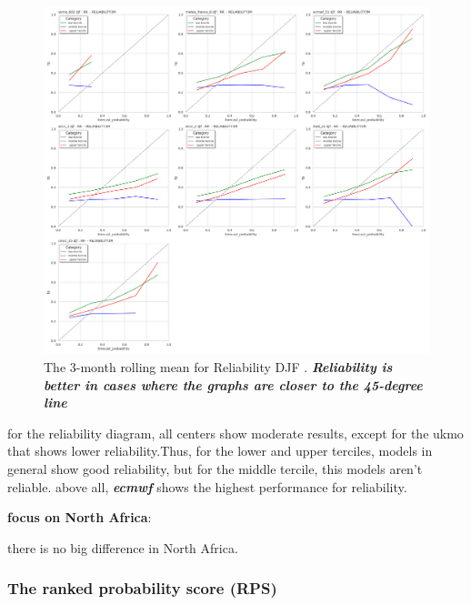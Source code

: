 \begin{figure}[H]
\centering
\includegraphics[scale=0.3]{plots/prob/rela/rela_diagram_RR_djf.png}
\caption{The 3-month rolling mean for Reliability DJF   . \textbf{\textit{Reliability is better in cases where the graphs are closer to the 45-degree line}}}
\end{figure}

for the reliability diagram, all centers show moderate results, except for the ukmo that shows lower reliability.Thus, for the lower and upper terciles, models in general show good reliability, but for the middle tercile, this models aren't reliable. above all, \textbf{\textit{ecmwf}}  shows the highest performance for reliability.

\vspace{1.5cm}
\textbf{focus on North Africa}:

there is no big difference in North Africa.


\subsubsection{The ranked probability score (RPS)}


